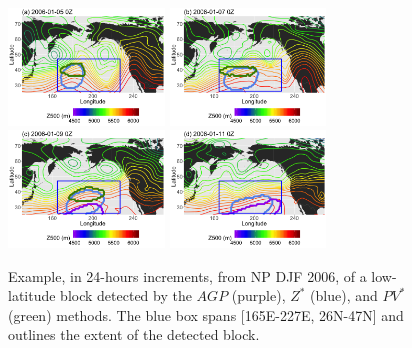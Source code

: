 \documentclass[smallextended]{svjour3}       %
\numberwithin{equation}{section}
\begin{document}
\begin{figure}
\centering
\includegraphics[width=0.37\textwidth]{fig16a}
\includegraphics[width=0.37\textwidth]{fig16b}\\
\includegraphics[width=0.37\textwidth]{fig16c}
\includegraphics[width=0.37\textwidth]{fig16d}
\caption{Example, in 24-hours increments, from NP DJF 2006, of a low-latitude block detected by the $AGP$ (purple), $Z^*$ (blue), and $PV^*$ (green) methods. The blue box spans [165E-227E, 26N-47N] and outlines the extent of the detected block.
}\label{lowlatdjf}
\end{figure}
\end{document}
